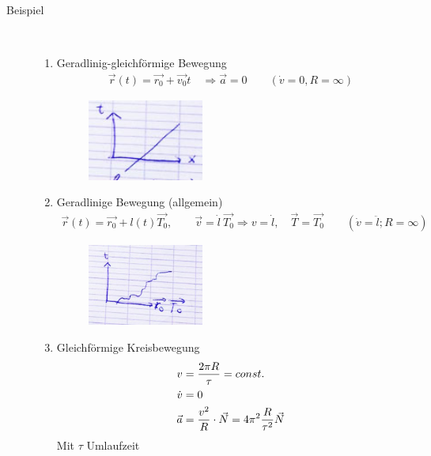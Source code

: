 
\begin{description}
\item[Beispiel]~\par
\begin{enumerate}
\item Geradlinig-gleichförmige Bewegung 
\begin{align*}
  \vec{r}(t)=\vec{r_0}+\vec{v_0}t \quad
  \Rightarrow\vec{a}=0 \qquad
  (\dot{v}=0, R=\infty)
\end{align*}
\begin{figure}[h]
\begin{center}
\includegraphics[width=0.4\textwidth]{Skizzen/Anhang8Kopie.jpg}
\end{center}
\caption{}
\end{figure}
\item Geradlinige Bewegung (allgemein)
\begin{align*}
\vec{r}(t)=\vec{r_0}+l(t)\vec{T_0},\qquad
\vec{v}=\dot{l}\: \vec{T_0} \Rightarrow v=\dot{l}, \quad
\vec{T}=\vec{T_0} \qquad
(\dot{v}=\ddot{l}; R=\infty)
\end{align*}
\begin{figure}[h]
\begin{center}
\includegraphics[width=0.4\textwidth]{Skizzen/Anhang8.jpg}
\end{center}
\caption{}
\end{figure}
\item Gleichförmige Kreisbewegung
\begin{align*}
v&=\frac{2\pi R}{\tau} = const.\\
\dot{v}&=0\\
\vec{a}&=\frac{v^2}{R}\cdot \vec{N}=4\pi^2\frac{R}{\tau^2}\vec{N}
\end{align*}
Mit $\tau$ Umlaufzeit\\


\end{enumerate}
\end{description}
